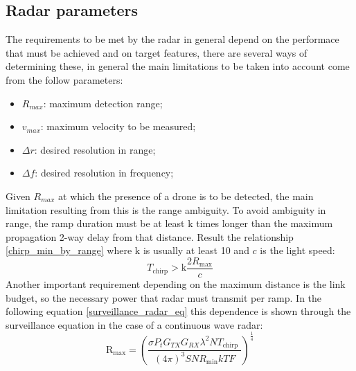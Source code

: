 \subsection{Radar parameters}
The requirements to be met by the radar in general depend on the performace that must be achieved and on target features, there are several ways of determining these, in general the main limitations to be taken into account come from the follow parameters:
\begin{itemize}
    \item \textbf{$R_{max}$}: maximum detection range;
    
    \item \textbf{$v_{max}$}: maximum velocity to be measured;
         
    \item \textbf{$\Delta r$}: desired resolution in range;
    
    \item \textbf{$\Delta f$}: desired resolution in frequency;
\end{itemize}
Given $R_{max}$ at which the presence of a drone is to be detected, the main limitation resulting from this is the range ambiguity. To avoid ambiguity in range, the ramp duration must be at least $\mathrm{k}$ times longer than the maximum propagation 2-way delay from that distance. Result the relationship \ref{chirp_min_by_range} where $\mathrm{k}$ is usually at least 10 and $c$ is the light speed:
\begin{equation}
T_{\text {chirp}}>\mathrm{k} \frac{2 R_{\max }}{c}
\label{chirp_min_by_range}
\end{equation}
Another important requirement depending on the maximum distance is the link budget, so the necessary power that radar must transmit per ramp. In the following equation \ref{surveillance_radar_eq} this dependence is shown through the surveillance equation in the case of a continuous wave radar:
\begin{equation}
\mathrm{R}_{\max }=\left(\frac{\sigma P_{t} G_{T X} G_{R X} \lambda^{2} NT_{\text {chirp }}}{(4 \pi)^{3} S N R_{\min } k T F}\right)^{\frac{1}{4}}
\label{surveillance_radar_eq}
\end{equation}

